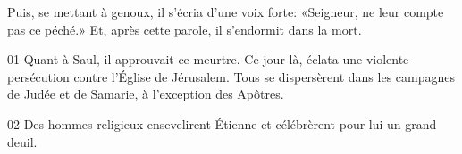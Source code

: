 Puis, se mettant à genoux, il s’écria d’une voix forte:
	«Seigneur, ne leur compte pas ce péché.»
Et, après cette parole, il s’endormit dans la mort.

01 Quant à Saul, il approuvait ce meurtre. Ce jour-là, éclata une violente persécution contre l’Église de Jérusalem. Tous se dispersèrent dans les campagnes de Judée et de Samarie, à l’exception des Apôtres.

02 Des hommes religieux ensevelirent Étienne et célébrèrent pour lui un grand deuil.